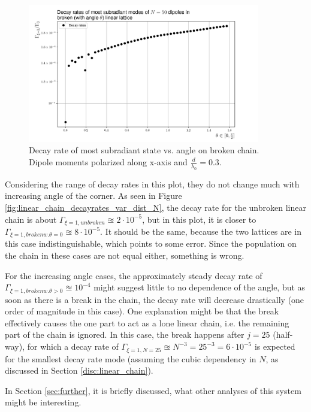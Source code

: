 \documentclass{article}
\begin{document}
\begin{figure}[H]
    \includegraphics[width=0.9\textwidth]{figs/case_linear_broken_rates.png}
    \caption{Decay rate of most subradiant state vs. angle on broken chain. Dipole moments polarized along x-axis and $\frac{d}{\lambda_0} = 0.3$. }
    \label{fig:linear_broken_rates}
\end{figure}
Considering the range of decay rates in this plot, they do not change much with increasing angle of the corner. As seen in Figure \ref{fig:linear_chain_decayrates_var_dist_N}, the decay rate for the unbroken linear chain is about $\Gamma_{\xi=1, unbroken} \approxeq 2 \cdot 10^{-5}$, but in this plot, it is closer to $\Gamma_{\xi=1, broken w. \theta = 0} \approxeq 8 \cdot 10^{-5}$. It should be the same, because the two lattices are in this case indistinguishable, which points to some error. Since the population on the chain in these cases are not equal either, something is wrong. 

For the increasing angle cases, the approximately steady decay rate of $\Gamma_{\xi = 1, broken w. \theta > 0} \approxeq 10^{-4}$ might suggest little to no dependence of the angle, but as soon as there is a break in the chain, the decay rate will decrease drastically (one order of magnitude in this case). One explanation might be that the break effectively causes the one part to act as a lone linear chain, i.e. the remaining part of the chain is ignored. In this case, the break happens after $j=25$ (half-way), for which a decay rate of $\Gamma_{\xi=1, N=25} \approxeq N^{-3} = 25^{-3} = 6 \cdot 10^{-5}$ is expected for the smallest decay rate mode (assuming the cubic dependency in $N$, as discussed in Section \ref{disc:linear_chain}). 

In Section \ref{sec:further}, it is briefly discussed, what other analyses of this system might be interesting. 
\end{document}
